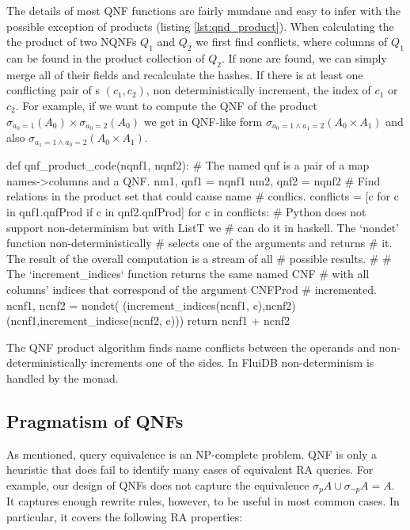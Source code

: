 The details of most QNF functions are fairly mundane and easy to infer
with the possible exception of products (listing
\ref{lst:qnd_product}). When calculating the the product of two NQNFs
\(Q_1\) and \(Q_2\) we first find conflicts, where columns of \(Q_1\)
can be found in the product collection of \(Q_2\). If none are found,
we can simply merge all of their fields and recalculate the hashes.
If there is at least one conflicting pair of s
\((c_1,c_2)\), non deterministically increment, the index of \(c_1\) or
\(c_2\). For example, if we want to compute the QNF of the product
\(\sigma_{a_0=1}(A_0) \times \sigma_{a_0=2}(A_0)\) we get in QNF-like
form \(\sigma_{a_0=1 \land a_1=2} (A_0 \times A_1)\) and also
\(\sigma_{a_1=1 \land a_0=2} (A_0 \times A_1)\).

\begin{code}
  \begin{pycode}
    def qnf_product_code(nqnf1, nqnf2):
        # The named qnf is a pair of a map names->columns and a QNF.
        nm1, qnf1 = nqnf1
        nm2, qnf2 = nqnf2
        # Find relations in the product set that could cause name
        # conflics.
        conflicts = [c for c in qnf1.qnfProd if c in qnf2.qnfProd]
        for c in conflicts:
            # Python does not support non-determinism but with ListT we
            # can do it in haskell. The `nondet' function non-deterministically
            # selects one of the arguments and returns
            # it. The result of the overall computation is a stream of all
            # possible results.
            #
            # The `increment_indices` function returns the same named CNF
            # with all columns' indices that correspond of the argument CNFProd
            # incremented.
            ncnf1, ncnf2 = nondet(
                (increment_indices(ncnf1, c),ncnf2)
                (ncnf1,increment_indicse(ncnf2, c)))
        return ncnf1 + ncnf2
\end{pycode}
  \caption{\label{lst:qnf_product}The QNF product algorithm finds name conflicts between the
    operands and non-deterministically increments one of the sides. In FluiDB non-determinism
    is handled by the  monad.}
\end{code}

\subsection{Pragmatism of QNFs}

As mentioned, query equivalence is an NP-complete problem. QNF is only
a heuristic that does fail to identify many cases of equivalent RA
queries.  For example, our design of QNFs does not capture the
equivalence \(\sigma_p A \cup \sigma_{\neg p} A = A\). It captures
enough rewrite rules, however, to be useful in most common cases. In
particular, it covers the following RA properties:

